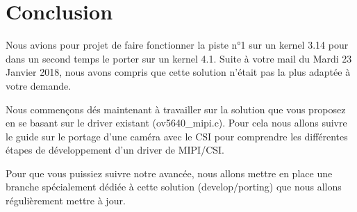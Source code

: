 
\chapter{Conclusion} %

\label{Chapter5} %




Nous avions pour projet de faire fonctionner la piste n°1 sur un kernel 3.14 pour dans un second temps 
le porter sur un kernel 4.1. Suite à votre mail du Mardi 23 Janvier 2018, nous avons compris que cette
solution n'était pas la plus adaptée à votre demande. \bigskip

Nous commençons dés maintenant à travailler sur la solution que vous proposez en se basant sur le driver
existant (ov5640\_mipi.c). Pour cela nous allons suivre le guide sur le portage d'une caméra avec le CSI
pour comprendre les différentes étapes de développement d'un driver de MIPI/CSI. \bigskip

Pour que vous puissiez suivre notre avancée, nous allons mettre en place une branche spécialement dédiée
à cette solution (develop/porting) que nous allons régulièrement mettre à jour.